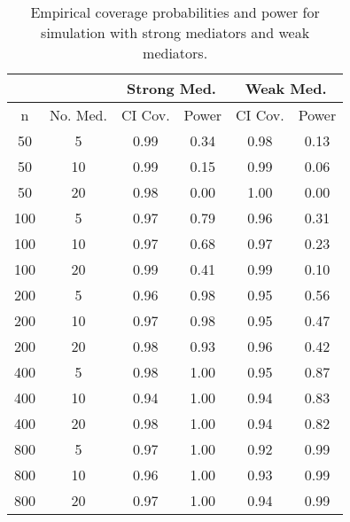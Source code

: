 \begin{table}[ht]
\centering
\begin{tabular}{c|c|cc|cc}
   & & \multicolumn{2}{c}{Strong Med.} & \multicolumn{2}{c}{Weak Med.} \\
 \hline
n & No. Med. & CI Cov. & Power & CI Cov. & Power \\ 
  \hline
50 & 5 & 0.99 & 0.34 & 0.98 & 0.13 \\ 
   \hline
50 & 10 & 0.99 & 0.15 & 0.99 & 0.06 \\ 
   \hline
50 & 20 & 0.98 & 0.00 & 1.00 & 0.00 \\ 
   \hline
100 & 5 & 0.97 & 0.79 & 0.96 & 0.31 \\ 
   \hline
100 & 10 & 0.97 & 0.68 & 0.97 & 0.23 \\ 
   \hline
100 & 20 & 0.99 & 0.41 & 0.99 & 0.10 \\ 
   \hline
200 & 5 & 0.96 & 0.98 & 0.95 & 0.56 \\ 
   \hline
200 & 10 & 0.97 & 0.98 & 0.95 & 0.47 \\ 
   \hline
200 & 20 & 0.98 & 0.93 & 0.96 & 0.42 \\ 
   \hline
400 & 5 & 0.98 & 1.00 & 0.95 & 0.87 \\ 
   \hline
400 & 10 & 0.94 & 1.00 & 0.94 & 0.83 \\ 
   \hline
400 & 20 & 0.98 & 1.00 & 0.94 & 0.82 \\ 
   \hline
800 & 5 & 0.97 & 1.00 & 0.92 & 0.99 \\ 
   \hline
800 & 10 & 0.96 & 1.00 & 0.93 & 0.99 \\ 
   \hline
800 & 20 & 0.97 & 1.00 & 0.94 & 0.99 \\ 
   \hline
\end{tabular}
\caption{Empirical coverage probabilities and power for simulation with strong mediators and weak mediators.\label{tab:sim_indep}} 
\end{table}
